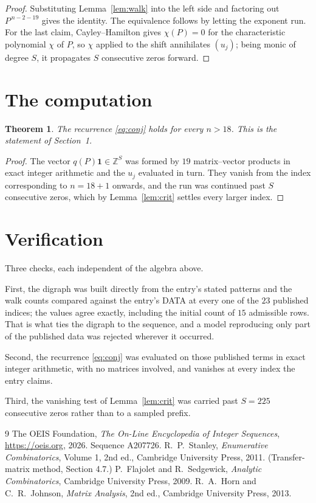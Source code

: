 \documentclass[11pt,a4paper]{article}
\theoremstyle{plain}
\newtheorem{theorem}{Theorem}
\theoremstyle{definition}
\begin{document}
\begin{proof}
Substituting Lemma~\ref{lem:walk} into the left side and factoring out
$P^{\,n-2-19}$ gives the identity. The equivalence follows by letting the exponent
run. For the last claim, Cayley--Hamilton gives $\chi(P)=0$ for the characteristic
polynomial $\chi$ of $P$, so $\chi$ applied to the shift annihilates $(u_j)$; being monic of
degree $S$, it propagates $S$ consecutive zeros forward.
\end{proof}

\section{The computation}

\begin{theorem}
The recurrence \eqref{eq:conj} holds for every $n>18$. This is the statement of
Section~1.
\end{theorem}

\begin{proof}
The vector $q(P)\mathbf{1}\in\mathbb{Z}^{S}$ was formed by $19$ matrix--vector
products in exact integer arithmetic and the $u_j$ evaluated in turn. They vanish from the
index corresponding to $n=18+1$ onwards, and the run was continued past $S$ consecutive
zeros, which by Lemma~\ref{lem:crit} settles every larger index.
\end{proof}

\section{Verification}

Three checks, each independent of the algebra above.

First, the digraph was built directly from the entry's stated patterns and the walk counts
compared against the entry's DATA at every one of the $23$ published indices; the
values agree exactly, including the initial count of $15$ admissible rows. That is
what ties the digraph to the sequence, and a model reproducing only part of the published
data was rejected wherever it occurred.

Second, the recurrence \eqref{eq:conj} was evaluated on those published terms in exact
integer arithmetic, with no matrices involved, and vanishes at every index the entry claims.

Third, the vanishing test of Lemma~\ref{lem:crit} was carried past $S=225$ consecutive
zeros rather than to a sampled prefix.

\begin{thebibliography}{9}
 The OEIS Foundation, \emph{The On-Line Encyclopedia of Integer
Sequences}, \url{https://oeis.org}, 2026. Sequence A207726.
 R.~P.~Stanley, \emph{Enumerative Combinatorics}, Volume 1, 2nd ed.,
Cambridge University Press, 2011. (Transfer-matrix method, Section 4.7.)
 P.~Flajolet and R.~Sedgewick, \emph{Analytic Combinatorics}, Cambridge
University Press, 2009.
 R.~A.~Horn and C.~R.~Johnson, \emph{Matrix Analysis}, 2nd ed., Cambridge
University Press, 2013.
\end{thebibliography}
\end{document}
